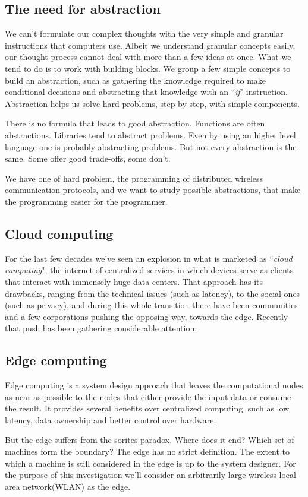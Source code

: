 \documentclass[runningheads]{llncs}
\begin{document}
\subsection{The need for abstraction}
We can't formulate our complex thoughts with the very simple and granular instructions that computers use.
Albeit we understand granular concepts easily, our thought process cannot deal with more than a few ideas at once. What we tend to do is to work with building blocks. We group a few simple concepts to build an abstraction, such as gathering the knowledge required to make conditional decisions and abstracting that knowledge with an ``\textit{if}" instruction.
Abstraction helps us solve hard problems, step by step, with simple components.
\par There is no formula that leads to good abstraction. Functions are often abstractions. Libraries tend to abstract problems.
Even by using an higher level language one is probably abstracting problems. But not every abstraction is the same. Some offer good trade-offs, some don't.
\par We have one of hard problem, the  programming of distributed wireless communication protocols, and we want to study possible abstractions, that make the programming easier for the programmer.
\subsection{Cloud computing}
For the last few decades we've seen an explosion in what is marketed as ``\textit{cloud computing}", the internet of centralized services in which devices serve as clients that interact with immensely huge data centers.
That approach has its drawbacks, ranging from the technical issues (such as latency), to the social ones (such as privacy), and during this whole transition there have been communities and a few corporations pushing the opposing way, towards the edge. Recently that push has been gathering considerable attention.
\subsection{Edge computing}
Edge computing is a system design approach that leaves the computational nodes as near as possible to the nodes that either provide the input data or consume the result.
It provides several benefits over centralized computing, such as low latency, data ownership and better control over hardware.
\par But the edge suffers from the sorites paradox. Where does it end? Which set of machines form the boundary?
The edge has no strict definition. The extent to which a machine is still considered in the edge is up to the system designer. For the purpose of this investigation we'll consider an arbitrarily large wireless local area network(WLAN) as the edge.
\end{document}

